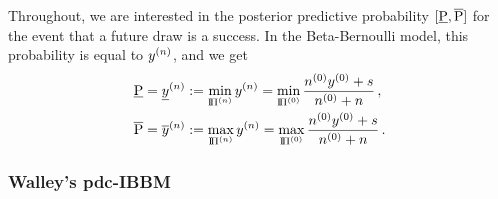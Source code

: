 Throughout, we are interested in the posterior predictive
probability $[\underline{\operatorname{P}},\overline{\operatorname{P}}]$ for the event that a
future draw is a success. In the Beta-Bernoulli model, this
probability is equal to $y^{(n)}$, and we get%
%
\begin{align}
\underline{\operatorname{P}} = \underline{y}^{(n)} &:= \min_{\text{I}\!\Pi^{(n)}} y^{(n)} = \min_{\text{I}\!\Pi^{(0)}} \frac{n^{(0)}y^{(0)} + s}{n^{(0)} +n}\,, \label{equ:General-Pl}\\
\overline{\operatorname{P}} = \overline{y}^{(n)} &:= \max_{\text{I}\!\Pi^{(n)}} y^{(n)} = \max_{\text{I}\!\Pi^{(0)}} \frac{n^{(0)}y^{(0)} + s}{n^{(0)} +n}\,. \label{equ:General-Pu}
\end{align}


\subsubsection{Walley's pdc-IBBM}
\label{sec:ibbm-walley}

